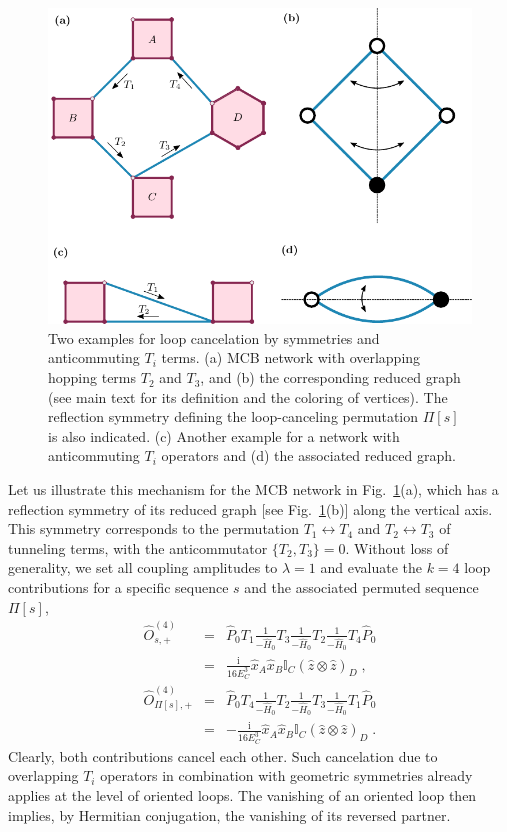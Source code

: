 \documentclass[twocolumn,floats,prx,showpacs]{revtex4-1}
\newcommand{\id}{\mathbb{I}}
\def\id{\mathbb{I}}
\begin{document}
\begin{figure}
\includegraphics[width=\columnwidth]{fig/ex2.pdf}
\caption{Two examples for loop cancelation by symmetries and anticommuting $T_i$ terms. (a) MCB network with overlapping hopping terms $T_2$ and $T_3$, and (b) the corresponding reduced graph (see main text for its definition and the coloring of vertices). The reflection symmetry defining the loop-canceling permutation $\Pi[s]$ is also indicated.  (c) Another example for a network with anticommuting $T_i$ operators and (d) the associated reduced graph. }
\label{fig:ex2}
\end{figure}

Let us illustrate this  mechanism for the MCB network in Fig.~\ref{fig:ex2}(a), which has a reflection symmetry of its reduced graph [see Fig.~\ref{fig:ex2}(b)] along the vertical axis.  This symmetry corresponds to the permutation $T_1 \leftrightarrow T_4$ and $T_2 \leftrightarrow T_3$ of tunneling terms, with the anticommutator $\{T_2,T_3\}=0$. Without loss of generality, we set all coupling amplitudes to $\lambda=1$ and evaluate the $k=4$ loop contributions for a specific sequence $s$ and the associated permuted sequence $\Pi[s]$,
\begin{eqnarray} \nonumber
\hat O^{(4)}_{s,+} &=&\hat P_0 T_1 \frac{1}{-\hat H_0} T_3 \frac{1}{-\hat H_0} T_2 \frac{1}{-\hat H_0} T_4 \hat P_0 \\
&=& \frac{\mathrm i}{16E_C^3} \hat x_A \hat x_B \id_C (\hat z \otimes \hat z)_D \;,\\ \nonumber
\hat O^{(4)}_{\Pi[s],+}&=&\hat P_0 T_4 \frac{1}{-\hat H_0} T_2 \frac{1}{-\hat H_0} T_3 \frac{1}{-\hat H_0} T_1 \hat P_0\\\nonumber &=&-\frac{\mathrm i}{16E_C^3} \hat x_A \hat x_B \id_C (\hat z \otimes \hat z)_D \;.
\end{eqnarray}
Clearly, both contributions cancel each other. Such cancelation due to overlapping  $T_i$ operators in combination with geometric symmetries already applies at the level of oriented loops. The vanishing of an oriented loop then implies,  by Hermitian conjugation, the vanishing of its reversed partner. 
\end{document}

